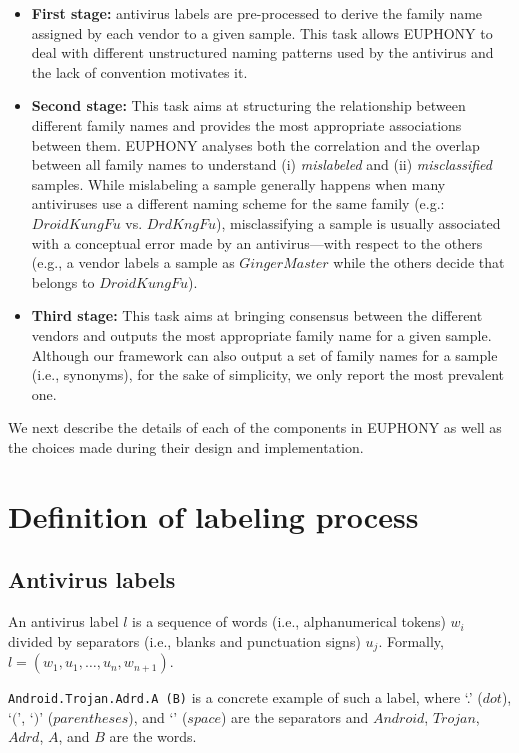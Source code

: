 \begin{itemize}
	\item \textbf{First stage:} antivirus labels are pre-processed to derive the family name assigned by each vendor to a given sample. This task allows EUPHONY to deal with different unstructured naming patterns used by the antivirus and the lack of convention motivates it.

	\item \textbf{Second stage:} This task aims at structuring the relationship between different family names and provides the most appropriate associations between them. EUPHONY analyses both the correlation and the overlap between all family names to understand (i) {\em mislabeled} and (ii) {\em misclassified} samples. While mislabeling a sample generally happens when many antiviruses use a different naming scheme for the same family (e.g.: $DroidKungFu$ vs. $DrdKngFu$), misclassifying a sample is usually associated with a conceptual error made by an antivirus---with respect to the others (e.g., a vendor labels a sample as $GingerMaster$ while the others decide that belongs to $DroidKungFu$).

	\item \textbf{Third stage:} This task aims at bringing consensus between the different vendors and outputs the most appropriate family name for a given sample. Although our framework can also output a set of family names for a sample (i.e., synonyms), for the sake of simplicity, we only report the most prevalent one.
\end{itemize}

We next describe the details of each of the components in EUPHONY as well as the choices made during their design and implementation.
\section{Definition of labeling process}
\subsection{Antivirus labels}

\begin{definition}
	An antivirus label $l$ is a sequence of words (i.e., alphanumerical tokens) $w_i$ divided by separators (i.e., blanks and punctuation signs) $u_j$. Formally, $l = (w_1, u_1, \dots, u_n, w_{n+1})$.
\end{definition}

\texttt{Android.Trojan.Adrd.A (B)} is a concrete example of such a label, where `.' ($dot$), `$($', `$)$' ($parentheses$), and `\textvisiblespace' ($space$) are the separators and $Android$, $Trojan$, $Adrd$, $A$, and $B$ are the words.


